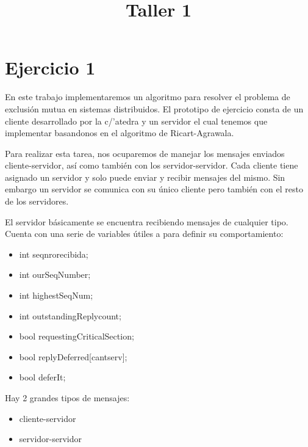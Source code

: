 \documentclass[a4paper, 10pt]{article}
\title{Taller 1}
\begin{document}
\maketitle

\newpage

\section{Ejercicio 1}

En este trabajo implementaremos un algoritmo para resolver el problema de exclusi\'on mutua en sistemas distribuidos. 
El prototipo de ejercicio consta de un cliente desarrollado por la c/'atedra y un servidor el cual tenemos que implementar basandonos en el algoritmo de Ricart-Agrawala.
\newline

Para realizar esta tarea, nos ocuparemos de manejar los mensajes enviados cliente-servidor, as\'i como tambi\'en con los servidor-servidor.
Cada cliente tiene asignado un servidor y solo puede enviar y recibir mensajes del mismo. Sin embargo un servidor se comunica con su \'unico cliente pero tambi\'en con el resto de los servidores.

El servidor b\'asicamente se encuentra recibiendo mensajes de cualquier tipo. Cuenta con una serie de variables \'utiles a para definir su comportamiento:

\begin{itemize}
\item int seqnrorecibida;
\item int ourSeqNumber;
\item int highestSeqNum;
\item int outstandingReplycount;
\item bool requestingCriticalSection;
\item bool replyDeferred[cantserv];
\item bool deferIt;
\end{itemize}

\vspace*{1em}
Hay 2 grandes tipos de mensajes:

\begin{itemize}
\item cliente-servidor
\item servidor-servidor
\end{itemize}
\end{document}
